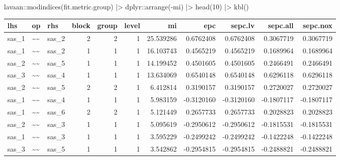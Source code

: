 \documentclass[
  letterpaper,
  DIV=11,
  numbers=noendperiod]{scrreprt}
\newenvironment{Shaded}{\begin{snugshade}}{\end{snugshade}}
\newcommand{\DecValTok}[1]{\textcolor[rgb]{0.68,0.00,0.00}{#1}}
\newcommand{\FunctionTok}[1]{\textcolor[rgb]{0.28,0.35,0.67}{#1}}
\newcommand{\NormalTok}[1]{\textcolor[rgb]{0.00,0.23,0.31}{#1}}
\newcommand{\SpecialCharTok}[1]{\textcolor[rgb]{0.37,0.37,0.37}{#1}}
\begin{document}
\begin{Shaded}
\begin{Highlighting}[]
\NormalTok{lavaan}\SpecialCharTok{::}\FunctionTok{modindices}\NormalTok{(fit.metric.group) }\SpecialCharTok{|\textgreater{}} 
\NormalTok{  dplyr}\SpecialCharTok{::}\FunctionTok{arrange}\NormalTok{(}\SpecialCharTok{{-}}\NormalTok{mi) }\SpecialCharTok{|\textgreater{}} 
  \FunctionTok{head}\NormalTok{(}\DecValTok{10}\NormalTok{) }\SpecialCharTok{|\textgreater{}} 
  \FunctionTok{kbl}\NormalTok{()}
\end{Highlighting}
\end{Shaded}

\begin{tabular}[t]{l|l|l|r|r|r|r|r|r|r|r}
\hline
lhs & op & rhs & block & group & level & mi & epc & sepc.lv & sepc.all & sepc.nox\\
\hline
sas\_1 & \textasciitilde{}\textasciitilde{} & sas\_2 & 2 & 2 & 1 & 25.539286 & 0.6762408 & 0.6762408 & 0.3067719 & 0.3067719\\
\hline
sas\_1 & \textasciitilde{}\textasciitilde{} & sas\_2 & 1 & 1 & 1 & 16.103743 & 0.4565219 & 0.4565219 & 0.1689964 & 0.1689964\\
\hline
sas\_2 & \textasciitilde{}\textasciitilde{} & sas\_5 & 1 & 1 & 1 & 14.199452 & 0.4501605 & 0.4501605 & 0.2466491 & 0.2466491\\
\hline
sas\_3 & \textasciitilde{}\textasciitilde{} & sas\_4 & 1 & 1 & 1 & 13.634069 & 0.6540148 & 0.6540148 & 0.6296118 & 0.6296118\\
\hline
sas\_2 & \textasciitilde{}\textasciitilde{} & sas\_5 & 2 & 2 & 1 & 6.412814 & 0.3190157 & 0.3190157 & 0.2720027 & 0.2720027\\
\hline
sas\_1 & \textasciitilde{}\textasciitilde{} & sas\_4 & 1 & 1 & 1 & 5.983159 & -0.3120160 & -0.3120160 & -0.1807117 & -0.1807117\\
\hline
sas\_1 & \textasciitilde{}\textasciitilde{} & sas\_6 & 2 & 2 & 1 & 5.121449 & 0.2657733 & 0.2657733 & 0.2028823 & 0.2028823\\
\hline
sas\_2 & \textasciitilde{}\textasciitilde{} & sas\_3 & 1 & 1 & 1 & 5.095619 & -0.2950612 & -0.2950612 & -0.1815531 & -0.1815531\\
\hline
sas\_1 & \textasciitilde{}\textasciitilde{} & sas\_3 & 1 & 1 & 1 & 3.595229 & -0.2499242 & -0.2499242 & -0.1422248 & -0.1422248\\
\hline
sas\_3 & \textasciitilde{}\textasciitilde{} & sas\_5 & 1 & 1 & 1 & 3.542862 & -0.2954815 & -0.2954815 & -0.2488821 & -0.2488821\\
\hline
\end{tabular}
\end{document}
